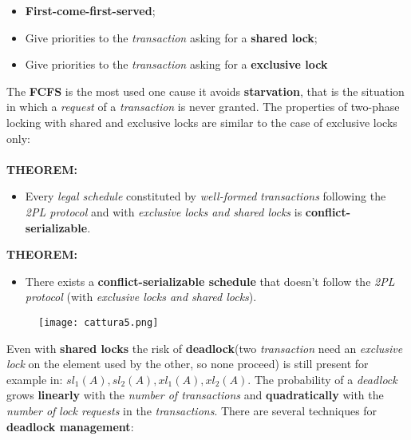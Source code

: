 \documentclass{article}
\begin{document}
\begin{itemize}
\item \textbf{First-come-first-served};
\item Give priorities to the \emph{transaction} asking for a \textbf{shared lock};
\item Give priorities to the \emph{transaction} asking for a \textbf{exclusive lock}
\end{itemize}
The \textbf{FCFS} is the most used one cause it avoids \textbf{starvation}, that is the situation in which a \emph{request} of a \emph{transaction} is never granted. The properties of two-phase locking with shared and exclusive locks are similar to the case of exclusive locks only:\\\\
\textbf{THEOREM:}
\begin{itemize}
\item Every \emph{legal schedule} constituted by \emph{well-formed} \emph{transactions} following the \emph{2PL protocol} and with \emph{exclusive locks and shared locks} is \textbf{conflict-serializable}.
\end{itemize}
\textbf{THEOREM:}
\begin{itemize}
\item There exists a \textbf{conflict-serializable schedule} that doesn't follow the \emph{2PL protocol} (with \emph{exclusive locks and shared locks}). 
\end{itemize}
\begin{figure}[H]
  \centering
  \texttt{[image: cattura5.png]}
\end{figure}
Even with \textbf{shared locks} the risk of \textbf{deadlock}(two \emph{transaction} need an \emph{exclusive lock} on the element used by the other, so none proceed) is still present for example in: $sl_1(A), sl_2(A), xl_1(A), xl_2(A)$. The probability of a \emph{deadlock} grows \textbf{linearly} with the \emph{number of transactions} and \textbf{quadratically} with the \emph{number of} \emph{lock requests} in the \emph{transactions}. 
\clearpage
There are several techniques for \textbf{deadlock management}:
\end{document}
